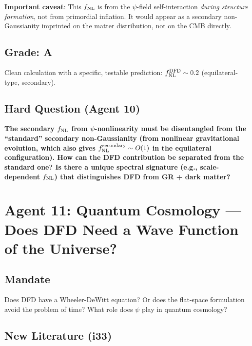 \documentclass[11pt,a4paper]{article}
\begin{document}
\textbf{Important caveat}: This $f_{\rm NL}$ is from the $\psi$-field self-interaction \emph{during structure formation}, not from primordial inflation. It would appear as a secondary non-Gaussianity imprinted on the matter distribution, not on the CMB directly.

\subsection{Grade: A}

Clean calculation with a specific, testable prediction: $f_{\rm NL}^{\rm DFD} \sim 0.2$ (equilateral-type, secondary).

\subsection{Hard Question (Agent 10)}

\textbf{The secondary $f_{\rm NL}$ from $\psi$-nonlinearity must be disentangled from the ``standard'' secondary non-Gaussianity (from nonlinear gravitational evolution, which also gives $f_{\rm NL}^{\rm secondary} \sim O(1)$ in the equilateral configuration). How can the DFD contribution be separated from the standard one? Is there a unique spectral signature (e.g., scale-dependent $f_{\rm NL}$) that distinguishes DFD from GR + dark matter?}

\newpage

\section{Agent 11: Quantum Cosmology --- Does DFD Need a Wave Function of the Universe?}
\label{sec:agent11}

\subsection{Mandate}

Does DFD have a Wheeler-DeWitt equation? Or does the flat-space formulation avoid the problem of time? What role does $\psi$ play in quantum cosmology?

\subsection{New Literature (i33)}
\end{document}
